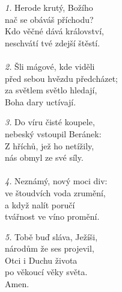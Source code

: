 \begin{translatioMulticol}{3}
{\color{red}\textit{1.}} Herode krutý, Božího\\
nač se obáváš příchodu?\\
Kdo věčné dává království,\\
neschvátí tvé zdejší štěstí.\\
\\
{\color{red}\textit{2.}} Šli mágové, kde viděli\\
před sebou hvězdu předcházet;\\
za světlem světlo hledají,\\
Boha dary uctívají.\columnbreak

{\color{red}\textit{3.}} Do víru čisté koupele,\\
nebeský vstoupil Beránek:\\
Z hříchů, jež ho netížily,\\
nás obmyl ze své síly.\\
\\
{\color{red}\textit{4.}} Neznámý, nový moci div:\\
ve štoudvích voda zrumění,\\
a když \ji{} nalít poručí\\
tvářnost ve víno promění.\columnbreak

{\color{red}\textit{5.}} Tobě buď sláva, Ježíši,\\
národům že ses projevil,\\
Otci i Duchu života\\
po věkoucí věky světa.\\
Amen.
\end{translatioMulticol}
